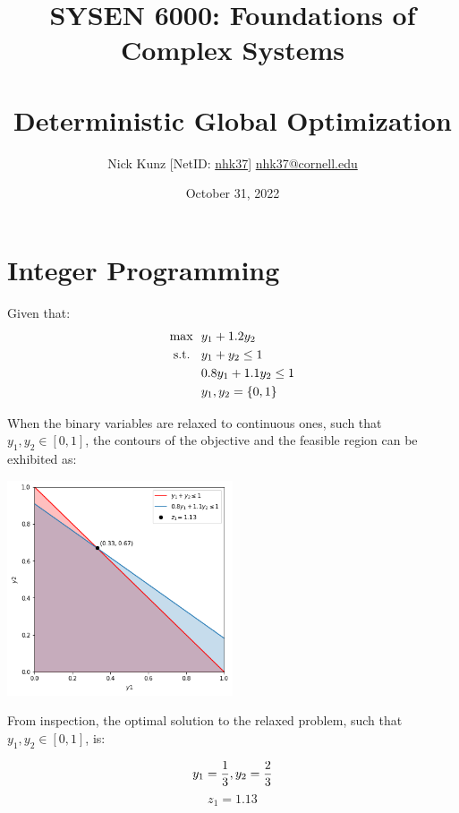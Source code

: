 \documentclass{article}
\begin{document}
\title{SYSEN 6000: Foundations of Complex Systems\\~\\
    \Large Deterministic Global Optimization
}
\author{
    Nick Kunz [NetID: \url{nhk37}] \hyperlink{nhk37@cornell.edu}{nhk37@cornell.edu}}
\date{October 31, 2022}
\maketitle
\thispagestyle{fancy}

\section*{Integer Programming}
Given that:
\begin{equation}
\begin{split}
    \text{max \space} & y_1 + 1.2y_2\\
    \text{s.t. \space} & \space y_1 + y_2 \leq 1\\
    & 0.8y_1 + 1.1y_2 \leq 1\\
    & y_1, y_2 = \{0, 1\}
\end{split}
\end{equation}

When the binary variables are relaxed to continuous ones, such that $y_1, y_2 \in [0, 1]$, the contours of the objective and the feasible region can be exhibited as:

    \begin{center}
        \includegraphics[width=0.50\textwidth]{zeee.png}
    \end{center}

From inspection, the optimal solution to the relaxed problem, such that $y_1, y_2 \in [0, 1]$, is:

    \begin{equation}
        y_1 = \frac{1}{3}, y_2 = \frac{2}{3}\\~\\
    \end{equation}
    \begin{equation}\nonumber
        z_1 = 1.13
    \end{equation}
\end{document}
